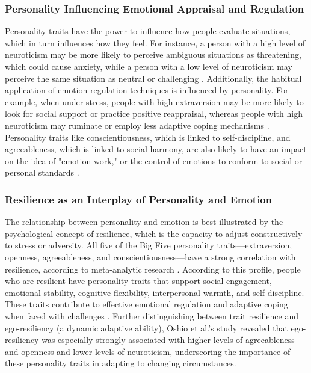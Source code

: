 \documentclass{DESSThesis}
\begin{document}
\subsubsection{Personality Influencing Emotional Appraisal and Regulation}
Personality traits have the power to influence how people evaluate situations, which in turn influences how they feel. For instance, a person with a high level of neuroticism may be more likely to perceive ambiguous situations as threatening, which could cause anxiety, while a person with a low level of neuroticism may perceive the same situation as neutral or challenging \cite{lerner_emotion_2015}. Additionally, the habitual application of emotion regulation techniques is influenced by personality. For example, when under stress, people with high extraversion may be more likely to look for social support or practice positive reappraisal, whereas people with high neuroticism may ruminate or employ less adaptive coping mechanisms \cite{paul_towards_2020}. Personality traits like conscientiousness, which is linked to self-discipline, and agreeableness, which is linked to social harmony, are also likely to have an impact on the idea of "emotion work," or the control of emotions to conform to social or personal standards \cite{hochschild_emotion_1979}.

\subsubsection{Resilience as an Interplay of Personality and Emotion}
The relationship between personality and emotion is best illustrated by the psychological concept of resilience, which is the capacity to adjust constructively to stress or adversity. All five of the Big Five personality traits—extraversion, openness, agreeableness, and conscientiousness—have a strong correlation with resilience, according to meta-analytic research \cite{oshio_resilience_2018}. According to this profile, people who are resilient have personality traits that support social engagement, emotional stability, cognitive flexibility, interpersonal warmth, and self-discipline. These traits contribute to effective emotional regulation and adaptive coping when faced with challenges \cite{oshio_resilience_2018}. Further distinguishing between trait resilience and ego-resiliency (a dynamic adaptive ability), Oshio et al.'s study revealed that ego-resiliency was especially strongly associated with higher levels of agreeableness and openness and lower levels of neuroticism, underscoring the importance of these personality traits in adapting to changing circumstances.
\end{document}
